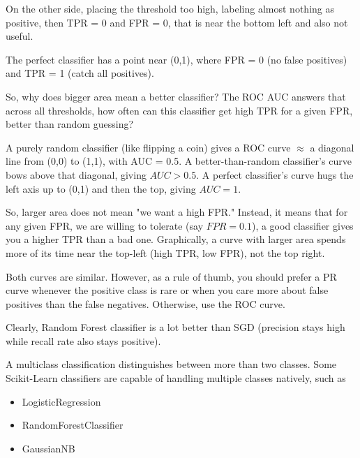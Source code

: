 {\begin{aside}
On the other side, placing the threshold too high, labeling almost nothing as positive, then TPR = 0 and FPR = 0, that is near the bottom left and also not useful.

The perfect classifier has a point near (0,1), where FPR = 0 (no false positives) and TPR = 1 (catch all positives).

So, why does bigger area mean a better classifier? The ROC AUC answers that across all thresholds, how often can this classifier get high TPR for a given FPR, better than random guessing?

A purely random classifier (like flipping a coin) gives a ROC curve $\approx$ a diagonal line from (0,0) to (1,1), with AUC = 0.5. A better-than-random classifier's curve bows above that diagonal, giving $AUC > 0.5$. A perfect classifier's curve hugs the left axis up to (0,1) and then the top, giving $AUC = 1$.

So, larger area does not mean "we want a high FPR." Instead, it means that for any given FPR, we are willing to tolerate (say $FPR = 0.1$), a good classifier gives you a higher TPR than a bad one. Graphically, a curve with larger area spends more of its time near the top-left (high TPR, low FPR), not the top right.
\end{aside}
\vs


Both curves are similar. However, as a rule of thumb, you should prefer a PR curve whenever the positive class is rare or when you care more about false positives than the false negatives. Otherwise, use the ROC curve.



Clearly, Random Forest classifier is a lot better than SGD (precision stays high while recall rate also stays positive).


A multiclass classification distinguishes between more than two classes. Some Scikit-Learn classifiers are capable of handling multiple classes natively, such as
\begin{itemize}
    \item LogisticRegression
    \item RandomForestClassifier
    \item GaussianNB
\end{itemize}
\vs

}
